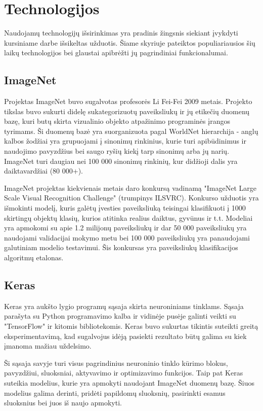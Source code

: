 \documentclass{VUMIFPSkursinis}
\begin{document}
\section{Technologijos}
Naudojamų technologijų išsirinkimas yra pradinis žingsnis siekiant įvykdyti kursiniame darbe išsikeltas užduotis. Šiame skyriuje pateiktos populiariausios šių laikų technologijos 
bei glaustai apibrėžti jų pagrindiniai funkcionalumai.

\subsection{ImageNet}
Projektas ImageNet buvo sugalvotas profesorės Li Fei-Fei 2009 metais. Projekto tikslas buvo sukurti didelę sukategorizuotų paveiksliukų ir jų etikečių duomenų bazę, 
kuri butų skirta vizualinio objekto atpažinimo programinės įrangos tyrimams. Ši duomenų bazė yra suorganizuota pagal WorldNet hierarchija - anglų kalbos žodžiai 
yra grupuojami į sinonimų rinkinius, kurie turi apibūdinimus ir naudojimo pavyzdžius bei saugo ryšių kiekį tarp sinonimų arba jų narių. ImageNet turi daugiau nei 
100 000 sinonimų rinkinių, kur didžioji dalis yra daiktavardžiai (80 000+). 

ImageNet projektas kiekvienais metais daro konkursą vadinamą "ImageNet Large Scale Visual Recognition Challenge" (trumpinys ILSVRC). Konkurso užduotis yra 
išmokinti modelį, kuris galėtų įvesties paveiksliuką teisingai klasifikuoti į 1000 skirtingų objektų klasių, kurios atitinka realius daiktus, gyvūnus ir t.t. Modeliai 
yra apmokomi su apie 1.2 milijonų paveiksliukų ir dar 50 000 paveiksliukų yra naudojami validacijai mokymo metu bei 100 000 paveiksliukų yra panaudojami galutiniam 
modelio testavimui. Šis konkursas yra paveiksliukų klasifikacijos algoritmų etalonas.

\subsection{Keras}
Keras yra aukšto lygio programų sąsaja skirta neuroniniams tinklams. Sąsaja parašyta su Python programavimo kalba ir vidinėje pusėje galinti veikti su "TensorFlow" 
ir kitomis bibliotekomis. Keras buvo sukurtas tikintis suteikti greitą eksperimentavimą, kad sugalvojus idėją pasiekti rezultato būtų galima su kiek įmanoma mažiau uždelsimo.

Ši sąsaja savyje turi visus pagrindinius neuroninio tinklo kūrimo blokus, pavyzdžiui, sluoksniai, aktyvavimo ir optimizavimo funkcijos. Taip pat Keras suteikia modelius, 
kurie yra apmokyti naudojant ImageNet duomenų bazę. Šiuos modelius galima derinti, pridėti papildomų sluoksnių, pasirinkti esamus sluoksnius bei juos iš naujo apmokyti.
\end{document}
